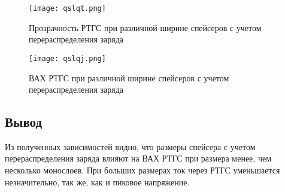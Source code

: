\begin{figure}[h!]
	\centering
	\texttt{[image: qslqt.png]}
	\caption{Прозрачность РТГС при различной ширине спейсеров с учетом перераспределения заряда}
	\label{fig:qslqt}
\end{figure}

\begin{figure}[h!]
	\centering
	\texttt{[image: qslqj.png]}
	\caption{ВАХ РТГС при различной ширине спейсеров с учетом перераспределения заряда}
	\label{fig:qslqj}
\end{figure}

\subsection{Вывод}
Из полученных зависимостей видно, что размеры спейсера с учетом перераспределения заряда влияют на ВАХ РТГС при размера менее, чем несколько монослоев. При больших размерах ток через РТГС уменьшается незначительно, так же, как и пиковое напряжение.